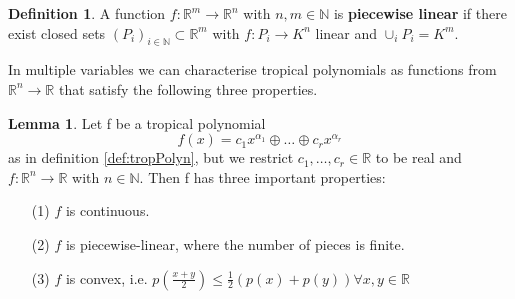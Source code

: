 \documentclass{article}
\theoremstyle{definition}
\newtheorem{lemma}[theorem]{Lemma}
\newtheorem{definition}[theorem]{Definition}
\begin{document}
\begin{definition}
A function $f : \mathbb{R}^{m} \to \mathbb{R}^{n}$ with $n, m \in \mathbb{N}$ is \textbf{piecewise linear} if there exist closed sets $(P_{i})_{i \in \mathbb{N}} \subset \mathbb{R}^{m}$ with $f : P_{i} \to K^{n}$ linear and $\cup_{i}P_{i} = K^{m}$.
\end{definition}

In multiple variables we can characterise tropical polynomials as functions from $\mathbb{R}^{n} \to \mathbb{R}$ that satisfy the following three properties.

\begin{lemma}\label{lemma:trop_properties}
Let f be a tropical polynomial
$$ f(x) = c_1 x^{\alpha_1} \oplus \dots \oplus c_r x^{\alpha_r}$$ as in definition \ref{def:tropPolyn}, but we restrict $c_1, \dots , c_r \in \mathbb{R}$ to be real and $f: \mathbb{R}^{n} \to \mathbb{R}$ with $n \in \mathbb{N}$. Then f has three important properties:
\begin{itemize}
\item[(1)]
$f$ is continuous.
\item[(2)]
$f$ is piecewise-linear, where the number of pieces is finite.
\item[(3)]
$f$ is convex, i.e. $p(\frac{x + y}{2}) \leq \frac{1}{2}(p(x)+p(y)) \forall x,y \in \mathbb{R}$
\end{itemize}
\end{lemma}
\end{document}
